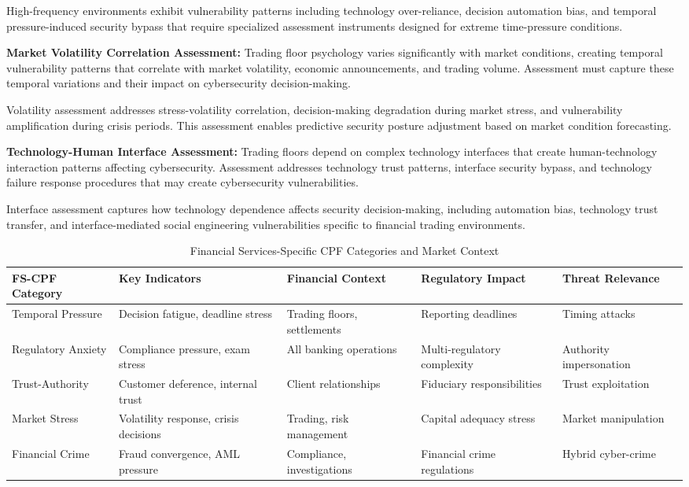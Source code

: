 \documentclass[10pt, twocolumn]{article}
\begin{document}
High-frequency environments exhibit vulnerability patterns including technology over-reliance, decision automation bias, and temporal pressure-induced security bypass that require specialized assessment instruments designed for extreme time-pressure conditions.

\textbf{Market Volatility Correlation Assessment:} Trading floor psychology varies significantly with market conditions, creating temporal vulnerability patterns that correlate with market volatility, economic announcements, and trading volume. Assessment must capture these temporal variations and their impact on cybersecurity decision-making.

Volatility assessment addresses stress-volatility correlation, decision-making degradation during market stress, and vulnerability amplification during crisis periods. This assessment enables predictive security posture adjustment based on market condition forecasting.

\textbf{Technology-Human Interface Assessment:} Trading floors depend on complex technology interfaces that create human-technology interaction patterns affecting cybersecurity. Assessment addresses technology trust patterns, interface security bypass, and technology failure response procedures that may create cybersecurity vulnerabilities.

Interface assessment captures how technology dependence affects security decision-making, including automation bias, technology trust transfer, and interface-mediated social engineering vulnerabilities specific to financial trading environments.

\begin{table*}[t]
\caption{Financial Services-Specific CPF Categories and Market Context}
\label{tab:financial_cpf_categories}
\centering
\small
\begin{tabular}{@{}p{3.2cm} p{3.0cm} p{2.8cm} p{3.0cm} p{3.0cm}@{}}
\toprule
\textbf{FS-CPF Category} & \textbf{Key Indicators} & \textbf{Financial Context} & \textbf{Regulatory Impact} & \textbf{Threat Relevance} \\
\midrule
Temporal Pressure & Decision fatigue, deadline stress & Trading floors, settlements & Reporting deadlines & Timing attacks \\
\midrule
Regulatory Anxiety & Compliance pressure, exam stress & All banking operations & Multi-regulatory complexity & Authority impersonation \\
\midrule
Trust-Authority & Customer deference, internal trust & Client relationships & Fiduciary responsibilities & Trust exploitation \\
\midrule
Market Stress & Volatility response, crisis decisions & Trading, risk management & Capital adequacy stress & Market manipulation \\
\midrule
Financial Crime & Fraud convergence, AML pressure & Compliance, investigations & Financial crime regulations & Hybrid cyber-crime \\
\bottomrule
\end{tabular}
\end{table*}
\end{document}
